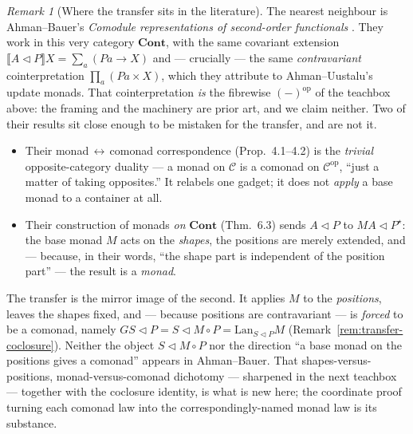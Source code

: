 \documentclass[11pt,a4paper]{book}
\newcommand{\Cont}{\mathbf{Cont}}
\newcommand{\cont}[2]{#1 \triangleleft #2}
\newcommand{\Ext}[1]{\llbracket #1 \rrbracket}
\theoremstyle{plain}
\theoremstyle{definition}
\theoremstyle{remark}
\newtheorem{Remark}[Theorem]{Remark}
\begin{document}
\begin{Remark}[Where the transfer sits in the literature]\label{rem:transfer-novelty}
The nearest neighbour is Ahman--Bauer's \emph{Comodule representations of second-order functionals}
\cite{AhmanBauer24}. They work in this very category $\Cont$, with the same covariant extension
$\Ext{\cont A P}X=\sum_{a}(Pa\to X)$ and --- crucially --- the same \emph{contravariant}
cointerpretation $\prod_{a}(Pa\times X)$, which they attribute to Ahman--Uustalu's update monads.
That cointerpretation \emph{is} the fibrewise $(-)^{\mathrm{op}}$ of the teachbox above: the framing
and the machinery are prior art, and we claim neither. Two of their results sit close enough to be
mistaken for the transfer, and are not it.
\begin{itemize}[nosep]
  \item Their monad$\,\leftrightarrow\,$comonad correspondence (Prop.~4.1--4.2) is the \emph{trivial}
        opposite-category duality --- a monad on $\mathcal C$ is a comonad on
        $\mathcal C^{\mathrm{op}}$, ``just a matter of taking opposites.'' It relabels one gadget; it
        does not \emph{apply} a base monad to a container at all.
  \item Their construction of monads \emph{on} $\Cont$ (Thm.~6.3) sends $\cont A P$ to
        $\cont{MA}{P^{\star}}$: the base monad $M$ acts on the \emph{shapes}, the positions are
        merely extended, and --- because, in their words, ``the shape part is independent of the
        position part'' --- the result is a \emph{monad}.
\end{itemize}
The transfer is the mirror image of the second. It applies $M$ to the \emph{positions}, leaves the
shapes fixed, and --- because positions are contravariant --- is \emph{forced} to be a comonad,
namely $G\cont SP=\cont S{M\circ P}=\mathrm{Lan}_{\cont SP}M$ (Remark~\ref{rem:transfer-coclosure}).
Neither the object $\cont S{M\circ P}$ nor the direction ``a base monad on the positions gives a
comonad'' appears in Ahman--Bauer. That shapes-versus-positions, monad-versus-comonad dichotomy ---
sharpened in the next teachbox --- together with the coclosure identity, is what is new here; the
coordinate proof turning each comonad law into the correspondingly-named monad law is its substance.


\end{Remark}
\end{document}
